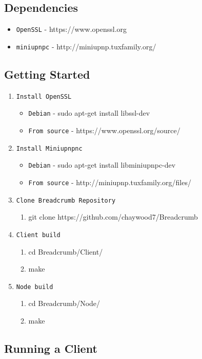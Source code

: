 \documentclass{article}
\begin{document}
\subsection{Dependencies}
\begin{itemize}
	\item \texttt{OpenSSL} - https://www.openssl.org
	\item \texttt{miniupnpc} - http://miniupnp.tuxfamily.org/
\end{itemize}
\subsection{Getting Started}
\begin{enumerate}
	\item \texttt{Install OpenSSL}
		\begin{itemize}
			\item \texttt{Debian} - sudo apt-get install libssl-dev
			\item \texttt{From source} - https://www.openssl.org/source/
		\end{itemize}
	\item \texttt{Install Miniupnpnc}
		\begin{itemize}
			\item \texttt{Debian} - sudo apt-get install libminiupnpc-dev
			\item \texttt{From source} - http://miniupnp.tuxfamily.org/files/
		\end{itemize}
	\item \texttt{Clone Breadcrumb Repository}
		\begin{enumerate}
			\item git clone https://github.com/chaywood7/Breadcrumb
		\end{enumerate}
	\item \texttt{Client build}
		\begin{enumerate}
			\item cd Breadcrumb/Client/
			\item make
		\end{enumerate}
	\item \texttt{Node build}
		\begin{enumerate}
			\item cd Breadcrumb/Node/
			\item make
		\end{enumerate}
\end{enumerate}

\subsection{Running a Client}
\end{document}
